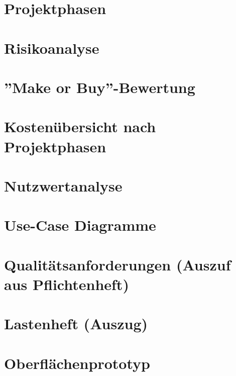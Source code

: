 \begin{appendices}

	
	\section{Projektphasen}		
		

	\section{Risikoanalyse}		
		
		
	\section{''Make or Buy''-Bewertung}		
		
	
	\section{Kostenübersicht nach Projektphasen}		
		

	\section{Nutzwertanalyse}		
		
		
	\section{Use-Case Diagramme}		
		
		
	\section{Qualitätsanforderungen (Auszuf aus Pflichtenheft)}		
		
		
	\section{Lastenheft (Auszug)}
		
		
	\section{Oberflächenprototyp}
		
		

\end{appendices}

